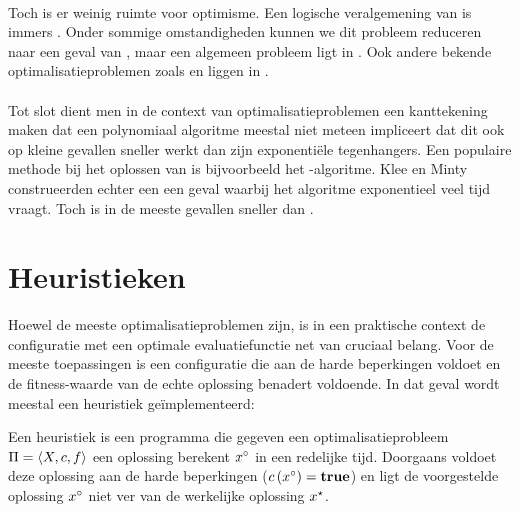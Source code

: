 \paragraph{}
Toch is er weinig ruimte voor optimisme. Een logische veralgemening van  is immers . Onder sommige omstandigheden kunnen we dit probleem reduceren naar een geval van \cite{Kozlov1980223}, maar een algemeen  probleem ligt in \cite{qpInNP}. Ook andere bekende optimalisatieproblemen zoals  en  liggen in .

\paragraph{}
Tot slot dient men in de context van optimalisatieproblemen een kanttekening maken dat een polynomiaal algoritme meestal niet meteen impliceert dat dit ook op kleine gevallen sneller werkt dan zijn exponenti\"ele tegenhangers. Een populaire methode bij het oplossen van  is bijvoorbeeld het -algoritme. Klee en Minty\cite{klee:1972} construeerden echter een een geval waarbij het algoritme exponentieel veel tijd vraagt. Toch is  in de meeste gevallen sneller dan .

\section{Heuristieken}

Hoewel de meeste optimalisatieproblemen  zijn, is in een praktische context de configuratie met een optimale evaluatiefunctie net van cruciaal belang. Voor de meeste toepassingen is een configuratie die aan de harde beperkingen voldoet en de fitness-waarde van de echte oplossing benadert voldoende. In dat geval wordt meestal een heuristiek ge\"implementeerd:

\begin{definition}[Heuristiek]
Een heuristiek is een programma die gegeven een optimalisatieprobleem $\Pi=\left\langle X,c,f\right\rangle$ een oplossing berekent $x^{\circ}$ in een redelijke tijd. Doorgaans voldoet deze oplossing aan de harde beperkingen ($c\left(x^{\circ}\right)=\mbox{\textbf{true}}$) en ligt de voorgestelde oplossing $x^{\circ}$ niet ver van de werkelijke oplossing $x^{\star}$.
\end{definition}

